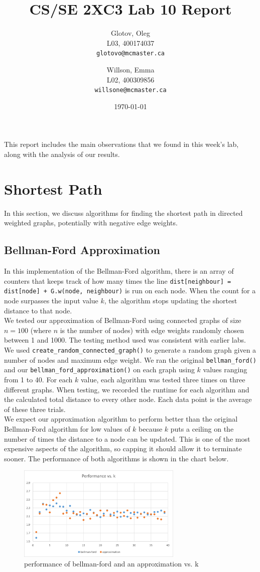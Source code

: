 \documentclass[12pt]{article}
\title{CS/SE 2XC3 Lab 10 Report}
\author{
  Glotov, Oleg\\ L03, 400174037\\
  \texttt{glotovo@mcmaster.ca}
  \and
  Willson, Emma\\ L02, 400309856\\
  \texttt{willsone@mcmaster.ca}
  }
\date{\today}
\begin{document}
\maketitle

This report includes the main observations that we found in this week's lab, along with the analysis of our results.

\newpage 
\section{Shortest Path}
In this section, we discuss algorithms for finding the shortest path in directed weighted graphs, potentially with negative edge weights. 
\subsection{Bellman-Ford Approximation}
In this implementation of the Bellman-Ford algorithm, there is an array of counters that keeps track of how many times the line \verb-dist[neighbour] = dist[node] + G.w(node, neighbour)- is run on each node. When the count for a node surpasses the input value $k$, the algorithm stops updating the shortest distance to that node.\\
We tested our approximation of Bellman-Ford using connected graphs of size $n=100$ (where $n$ is the number of nodes) with edge weights randomly chosen between 1 and 1000.
The testing method used was consistent with earlier labs. We used \verb+create_random_connected_graph()+ to generate a random graph given a number of nodes and maximum edge weight. We ran the original \verb+bellman_ford()+ and our \verb+bellman_ford_approximation()+ on each graph using $k$ values ranging from 1 to 40. For each $k$ value, each algorithm was tested three times on three different graphs. When testing, we recorded the runtime for each algorithm and the calculated total distance to every other node. Each data point is the average of these three trials. \\
We expect our approximation algorithm to perform better than the original Bellman-Ford algorithm for low values of $k$ because $k$ puts a ceiling on the number of times the distance to a node can be updated. This is one of the most expensive aspects of the algorithm, so capping it should allow it to terminate sooner. The performance of both algorithms is shown in the chart below.
\begin{figure}[H]
\centering
\includegraphics[width=0.7\textwidth,height=\textheight,keepaspectratio]{bellman_ford_time.png}
\caption{performance of bellman-ford and an approximation vs. k}
\label{Figure: m1}
\end{figure}
\end{document}

